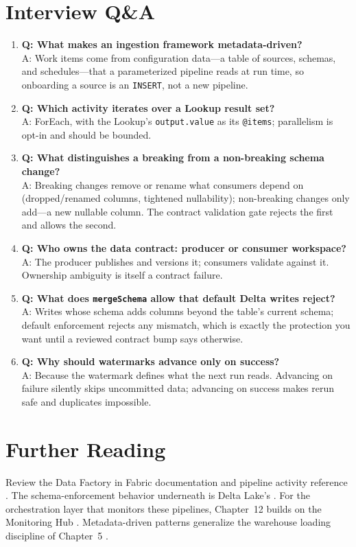 \section{Interview Q\&A}
\begin{enumerate}
    \item \textbf{Q: What makes an ingestion framework metadata-driven?}\\
    A: Work items come from configuration data---a table of sources, schemas, and schedules---that a parameterized pipeline reads at run time, so onboarding a source is an \texttt{INSERT}, not a new pipeline.
    \item \textbf{Q: Which activity iterates over a Lookup result set?}\\
    A: ForEach, with the Lookup's \texttt{output.value} as its \texttt{@items}; parallelism is opt-in and should be bounded.
    \item \textbf{Q: What distinguishes a breaking from a non-breaking schema change?}\\
    A: Breaking changes remove or rename what consumers depend on (dropped/renamed columns, tightened nullability); non-breaking changes only add---a new nullable column. The contract validation gate rejects the first and allows the second.
    \item \textbf{Q: Who owns the data contract: producer or consumer workspace?}\\
    A: The producer publishes and versions it; consumers validate against it. Ownership ambiguity is itself a contract failure.
    \item \textbf{Q: What does \texttt{mergeSchema} allow that default Delta writes reject?}\\
    A: Writes whose schema adds columns beyond the table's current schema; default enforcement rejects any mismatch, which is exactly the protection you want until a reviewed contract bump says otherwise.
    \item \textbf{Q: Why should watermarks advance only on success?}\\
    A: Because the watermark defines what the next run reads. Advancing on failure silently skips uncommitted data; advancing on success makes rerun safe and duplicates impossible.
\end{enumerate}

\section{Further Reading}
Review the Data Factory in Fabric documentation \cite{microsoftFabricDataFactory} and pipeline activity reference \cite{microsoftFabricPipelines}. The schema-enforcement behavior underneath is Delta Lake's \cite{deltaLakeDocs}. For the orchestration layer that monitors these pipelines, Chapter~12 builds on the Monitoring Hub \cite{microsoftFabricMonitoringHub}. Metadata-driven patterns generalize the warehouse loading discipline of Chapter~5 \cite{microsoftFabricCopyInto}.

